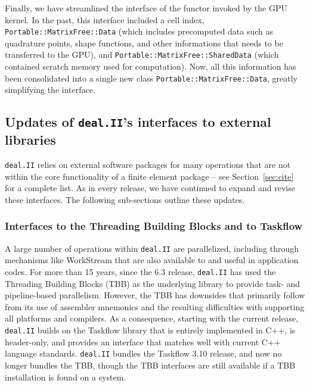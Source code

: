 \documentclass{ansarticle-preprint}
\newcommand{\specialword}[1]{\texttt{#1}}
\newcommand{\dealii}{{\specialword{deal.II}}\xspace}
\begin{document}
Finally, we have streamlined the interface of the functor invoked by the GPU
kernel. In the past, this interface included a cell index,
\texttt{Portable::MatrixFree::Data} (which includes precomputed data such as
quadrature points, shape functions, and other informations that needs to be
transferred to the GPU), and \texttt{Portable::MatrixFree::SharedData} (which
contained scratch memory used for computation). Now, all this information has
been consolidated into a single new class
\texttt{Portable::MatrixFree::Data}, greatly simplifying the interface.


\subsection{Updates of \dealii{}'s interfaces to external libraries}
\label{subsec:external}

\dealii{} relies on external software packages for many operations
that are not within the core functionality of a finite element package
-- see Section~\ref{sec:cite} for a complete list. As in every
release, we have continued to expand and revise these interfaces. The
following sub-sections outline these updates.

\subsubsection{Interfaces to the Threading Building Blocks and to
  Taskflow}

A large number of operations within \dealii{} are parallelized,
including through mechanisms like WorkStream \cite{TKB16} that are
also available to and useful in application codes. For more than
15 years, since the 6.3 release, \dealii{} has used the Threading
Building Blocks (TBB) \cite{reinders2007tbb} as the underlying library to
provide task- and pipeline-based parallelism. However, the TBB has
downsides that primarily follow from its use of assembler mnemonics
and the resulting difficulties with supporting all platforms and
compilers. As a consequence, starting with the current release,
\dealii{} builds on the Taskflow library \cite{huang2021taskflow} that
is entirely implemented in C++, is header-only, and provides an
interface that matches well with current C++ language standards. \dealii{}
bundles the Taskflow 3.10 release, and now no longer bundles the TBB,
though the TBB interfaces are still available if a TBB installation
is found on a system.
\end{document}
